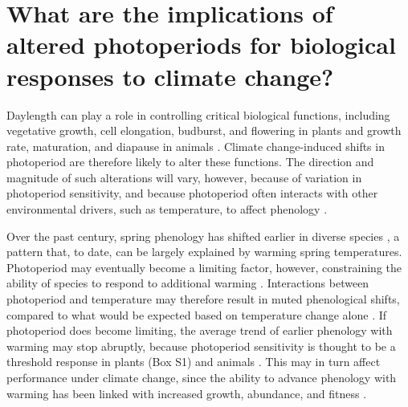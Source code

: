 \documentclass{article}
\begin{document}
\section*{What are the implications of altered photoperiods for biological responses to climate change?}
\par Daylength can play a role in controlling critical biological functions, including vegetative growth, cell elongation, budburst, and flowering in plants \citep{linkosalo2006,erwin1998,sidaway2010,Hsu:2011,Heide:2011aa,Ashby:1962aa,Heide:2012aa,mimura2007} and growth rate, maturation, and diapause in animals \citep{muir1994,bradshaw2006,saunders1970,tobin2008}. Climate change-induced shifts in photoperiod are therefore likely to alter these functions. The direction and magnitude of such alterations will vary, however, because of variation in photoperiod sensitivity, and because photoperiod often interacts with other environmental drivers, such as temperature, to affect phenology \citep [Box 1,][]{zydlewski2014}. 

\par Over the past century, spring phenology has shifted earlier in diverse species \citep{menzel2000,ovaskainen2013,penuelas2002,polgar2013}, a pattern that, to date, can be largely explained by warming spring temperatures. Photoperiod may eventually become a limiting factor, however, constraining the ability of species to respond to additional warming \citep{koerner2010b,vitasse2013, Morin:2010aa,Nienstaedt:1966aa}. Interactions between photoperiod and temperature may therefore result in muted phenological shifts, compared to what would be expected based on temperature change alone \citep{wareing1956,mimura2007,koerner2010b}. If photoperiod does become limiting, the average trend of earlier phenology with warming may stop abruptly, because photoperiod sensitivity is thought to be a threshold response in plants (Box S1) and animals \citep{tobin2008,}. This may in turn affect performance under climate change, since the ability to advance phenology with warming has been linked with increased growth, abundance, and fitness \citep{muir1994,cleland2012,willis2010}.

\end{document}
